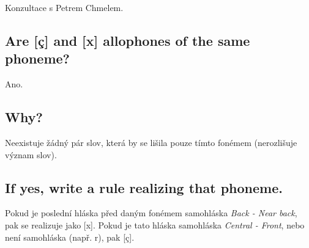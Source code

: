 \documentclass[a4paper]{article}
\begin{document}
\thispagestyle{fancy} %
{}

Konzultace s Petrem Chmelem.

\subsection*{Are [ç] and [x] allophones of the same phoneme?}
Ano.

\subsection*{Why?}
Neexistuje žádný pár slov, která by se lišila pouze tímto fonémem (nerozlišuje význam slov). 

\subsection*{If yes, write a rule realizing that phoneme.}
Pokud je poslední hláska před daným fonémem samohláska \textit{Back - Near back}, pak se realizuje jako [x]. Pokud je tato hláska samohláska \textit{Central - Front}, nebo není samohláska (např. r), pak [ç].
\end{document}
